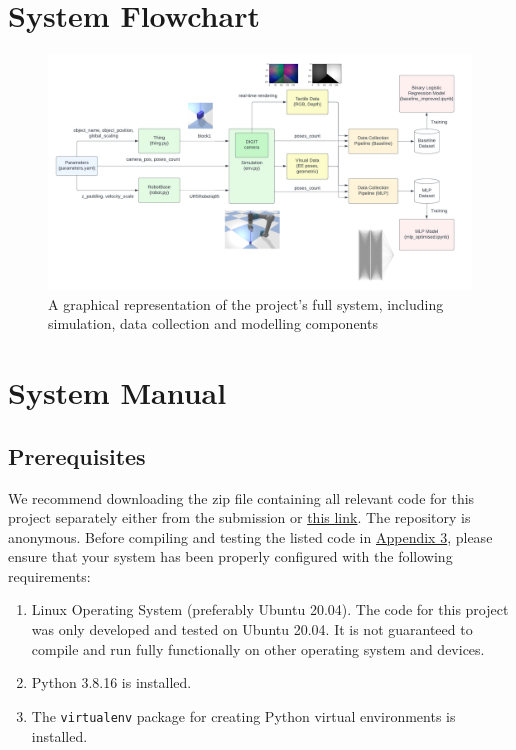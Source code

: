 \documentclass[11pt, a4paper]{report}
\begin{document}
 

\appendix
\printbibliography

\chapter{System Flowchart}\label{apdx:1}
\begin{figure}[H]
    \centering
    \includegraphics[width=\textwidth]{docs/Project Report/Media/appendix_project_architecture.png}
    \caption{A graphical representation of the project's full system, including simulation, data collection and modelling components}
    \label{fig:apdx1}
\end{figure}


\chapter{System Manual}\label{apdx:2}
\section{Prerequisites}\label{apdx:2.1}
We recommend downloading the zip file containing all relevant code for this project separately either from the submission or \hyperref[]{this link}. The repository is anonymous. Before compiling and testing the listed code in \hyperref[apdx:3]{Appendix 3}, please ensure that your system has been properly configured with the following requirements:
\begin{enumerate}
    \item Linux Operating System (preferably Ubuntu 20.04). The code for this project was only developed and tested on Ubuntu 20.04. It is not guaranteed to compile and run fully functionally on other operating system and devices.
    \item Python 3.8.16 is installed.
    \item The \verb|virtualenv| package for creating Python virtual environments is installed.
\end{enumerate}
\end{document}
